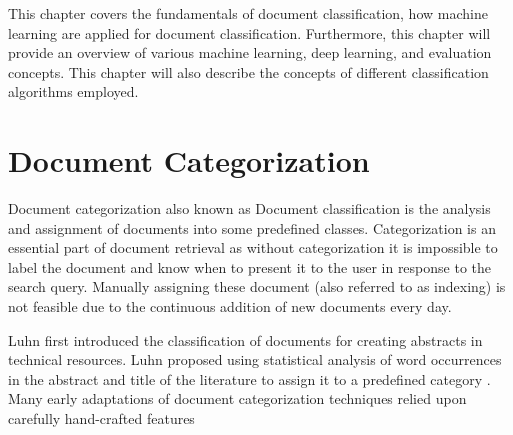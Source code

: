 \label{ch:background}

This chapter covers the fundamentals of document classification, how machine learning are applied for document classification. Furthermore, this chapter will provide an overview of various machine learning, deep learning, and evaluation concepts.  This chapter will also describe the concepts of different classification algorithms employed. 

\section{Document Categorization}
Document categorization also known as Document classification is the analysis and assignment of documents into some predefined classes. Categorization is an essential part of document retrieval as without categorization it is impossible to label the document and know when to present it to the user in response to the search query. Manually assigning these document (also referred to as indexing) is not feasible due to the continuous addition of new documents every day.

Luhn first introduced the classification of documents for creating abstracts in technical resources. Luhn proposed using statistical analysis of word occurrences in the abstract and title of the literature to assign it to a predefined category \cite{luhn1958automatic}. Many early adaptations of document categorization techniques relied upon carefully hand-crafted features \cite{Hayes:1990:CSC:645450.653070, Biebricher:1988:AIS:62437.62470}

